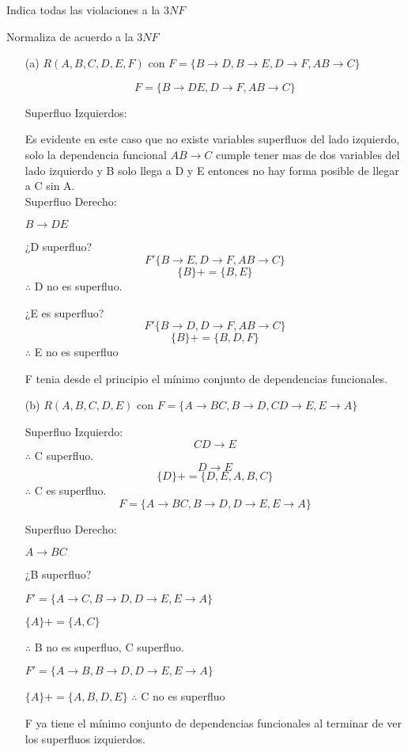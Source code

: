 \documentclass{article}
\begin{document}
    Indica todas las violaciones a la $3NF$

    Normaliza de acuerdo a la $3NF$

    \begin{enumerate}
      \item[(a)] $R(A,B,C,D,E,F)$ con $F = \{B \rightarrow D, B \rightarrow E,
      D \rightarrow F, AB \rightarrow C\}$

      $$F=\{B \rightarrow DE, D \rightarrow F, AB \rightarrow C\}$$


      Superfluo Izquierdos:

      Es evidente en este caso que no existe variables superfluos del lado
      izquierdo, solo la dependencia funcional $AB \rightarrow C$  cumple tener
      mas de dos variables del lado izquierdo y B solo llega a D y E entonces no hay forma posible de llegar a C sin A.\\


      Superfluo Derecho:

      $B \rightarrow DE$

      ¿D superfluo?
      $$F'\{B \rightarrow E, D \rightarrow F, AB \rightarrow C\}$$
      $$\{B\}+=\{B,E\}$$
      $\therefore $ D no es superfluo.


      ¿E es superfluo?
      $$F'\{B \rightarrow D, D \rightarrow F, AB \rightarrow C\}$$
      $$\{B\}+=\{B,D,F\}$$
      $\therefore$ E no es superfluo

      F tenia desde el principio el mínimo conjunto de dependencias funcionales.

      \item[(b)] $R(A,B,C,D,E)$ con $F = \{A \rightarrow BC, B \rightarrow D,
      CD \rightarrow E, E \rightarrow A\}$

      Superfluo Izquierdo:
      $$CD \rightarrow E$$
      $\therefore$ C superfluo.
      $$D \rightarrow E$$
      $$\{D\}+=\{D,E,A,B,C\}$$
      $\therefore$ C es superfluo.
      $$F=\{A \rightarrow BC, B\rightarrow D, D\rightarrow E, E \rightarrow A\}$$

      Superfluo Derecho:

      $A\rightarrow BC$

      ¿B superfluo?

      $F'=\{A \rightarrow C, B \rightarrow D, D\rightarrow E, E\rightarrow A\}$

      $\{A\}+=\{A,C\}$

      $\therefore$ B no es superfluo, C superfluo.

      $F'=\{A \rightarrow B, B \rightarrow D, D\rightarrow E, E \rightarrow A\}$

      $\{A\}+=\{A,B,D,E\}$
      $\therefore$ C no es superfluo

      F ya tiene el mínimo conjunto de dependencias funcionales al terminar de
      ver los superfluos izquierdos.
    \end{enumerate}
\end{document}
